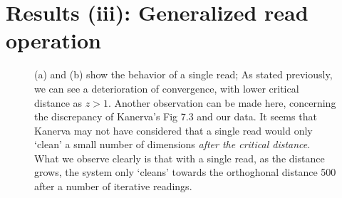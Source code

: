 \chapter{Results (iii): Generalized read operation}

\begin{figure}[h!]
  \centering


  \caption{(a) and (b) show the behavior of a single read; As stated previously, we can see a deterioration of convergence, with lower critical distance as $z>1$.  Another observation can be made here, concerning the discrepancy of Kanerva's Fig 7.3 and our data.  It seems that Kanerva may not have considered that a single read would only `clean' a small number of dimensions \emph{after the critical distance}. What we observe clearly is that with a single read, as the distance grows, the system only `cleans' towards the orthoghonal distance 500 after a number of iterative readings.}
  \label{fig:murillo-generalization-experiments}
\end{figure}

